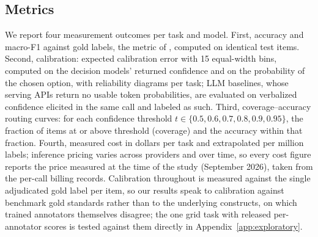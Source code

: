 \documentclass[11pt]{article}
\begin{document}
\subsection{Metrics}
We report four measurement outcomes per task and model. First, accuracy and macro-F1 against gold labels, the metric of \citet{ziems2024llms}, computed on identical test items. Second, calibration: expected calibration error with 15 equal-width bins, computed on the decision models' returned confidence and on the probability of the chosen option, with reliability diagrams per task; LLM baselines, whose serving APIs return no usable token probabilities, are evaluated on verbalized confidence elicited in the same call and labeled as such. Third, coverage--accuracy routing curves: for each confidence threshold $t \in \{0.5, 0.6, 0.7, 0.8, 0.9, 0.95\}$, the fraction of items at or above threshold (coverage) and the accuracy within that fraction. Fourth, measured cost in dollars per task and extrapolated per million labels; inference pricing varies across providers and over time, so every cost figure reports the price measured at the time of the study (September 2026), taken from the per-call billing records. Calibration throughout is measured against the single adjudicated gold label per item, so our results speak to calibration against benchmark gold standards rather than to the underlying constructs, on which trained annotators themselves disagree; the one grid task with released per-annotator scores is tested against them directly in Appendix~\ref{app:exploratory}.
\end{document}
